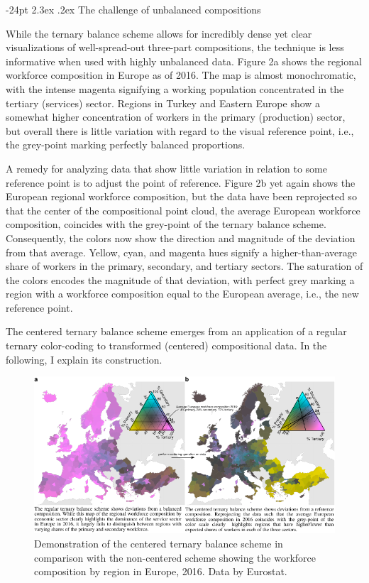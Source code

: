 \documentclass[10pt,twoside,reqno]{article}
\makeatletter
\def\cnstmaxfigwidth{
      \ifdim \Gin@nat@width>\linewidth
        \linewidth
      \else \Gin@nat@width
      \fi
    }
\let\Oldincludegraphics\includegraphics
\renewcommand{\includegraphics}[1]{\Oldincludegraphics[width=\cnstmaxfigwidth]{#1}}
\renewcommand\section{\@startsection {section}{1}{\z@}%
                                   {-24pt}%
                                   {2.3ex \@plus.2ex}%
                                   {\normalfont\large\bfseries}}
\makeatother
\begin{document}
\hypertarget{the-challenge-of-unbalanced-compositions}{%
\section{The challenge of unbalanced
compositions}\label{the-challenge-of-unbalanced-compositions}}

While the ternary balance scheme allows for incredibly dense yet clear
visualizations of well-spread-out three-part compositions, the technique
is less informative when used with highly unbalanced data. Figure 2a
shows the regional workforce composition in Europe as of 2016. The map
is almost monochromatic, with the intense magenta signifying a working
population concentrated in the tertiary (services) sector. Regions in
Turkey and Eastern Europe show a somewhat higher concentration of
workers in the primary (production) sector, but overall there is little
variation with regard to the visual reference point, i.e., the
grey-point marking perfectly balanced proportions.

A remedy for analyzing data that show little variation in relation to
some reference point is to adjust the point of reference. Figure 2b yet
again shows the European regional workforce composition, but the data
have been reprojected so that the center of the compositional point
cloud, the average European workforce composition, coincides with the
grey-point of the ternary balance scheme. Consequently, the colors now
show the direction and magnitude of the deviation from that average.
Yellow, cyan, and magenta hues signify a higher-than-average share of
workers in the primary, secondary, and tertiary sectors. The saturation
of the colors encodes the magnitude of that deviation, with perfect grey
marking a region with a workforce composition equal to the European
average, i.e., the new reference point.

The centered ternary balance scheme emerges from an application of a
regular ternary color-coding to transformed (centered) compositional
data. In the following, I explain its construction.

\begin{figure}
\centering
\includegraphics{figure2.pdf}
\caption{Demonstration of the centered ternary balance scheme in
comparison with the non-centered scheme showing the workforce
composition by region in Europe, 2016. Data by Eurostat.}
\end{figure}
\end{document}
